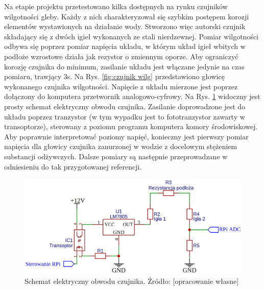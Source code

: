 Na etapie projektu przetestowano kilka dostępnych na rynku czujników wilgotności gleby. Każdy z nich charakteryzował się szybkim postępem korozji elementów wystawionych na działanie wody. Stworzono więc autorski czujnik składający się z dwóch igieł wykonanych ze stali nierdzewnej. Pomiar wilgotności odbywa się poprzez pomiar napięcia układu, w którym układ igieł wbitych w podłoże wzrostowe działa jak rezystor o zmiennym oporze. Aby ograniczyć korozję czujnika do minimum, zasilanie układu jest włączane jedynie na czas pomiaru, trawjący 3s. Na Rys. \ref{fig:czujnik wilg} przedstawiono głowicę wykonanego czujnika wilgotności. Napięcie z układu mierzone jest poprzez dołączony do komputera przetwornik analogowo-cyfrowy. Na Rys. \ref{fig:czujnik wilg sch} widoczny jest prosty schemat elektryczny obwodu czujnika. Zasilanie doprowadzone jest do układu poprzez tranzystor (w tym wypadku jest to fototranzystor zawarty w transoptorze), sterowany z poziomu programu komputera komory środowiskowej. Aby poprawnie interpretować poziomy napięć, konieczny jest pierwszy pomiar napięcia dla głowicy czujnika zanurzonej w wodzie z docelowym stężeniem substancji odżywczych. Dalsze pomiary są następnie przeprowadzane w odniesieniu do tak przygotowanej referencji.

\begin{figure}[h]
	\centering
	\includegraphics[scale=.4]{schemat_wilg}
	\caption{Schemat elektryczny obwodu czujnika. Źródło: [opracowanie własne]} 
	\label{fig:czujnik wilg sch}
\end{figure}


